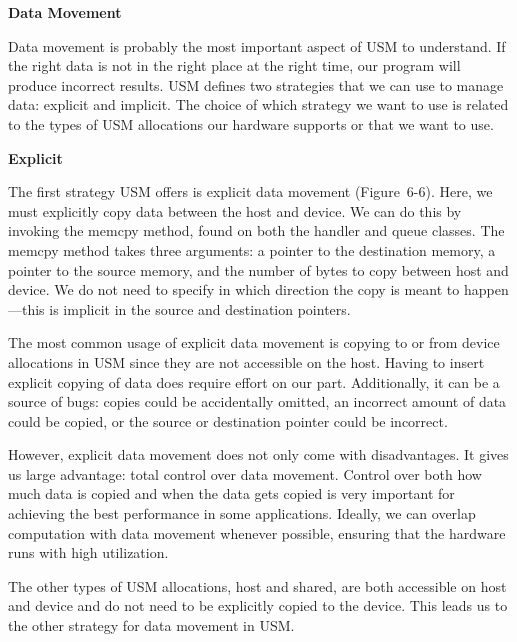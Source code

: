 \hspace*{\fill} \par %
\textbf{Data Movement}

Data movement is probably the most important aspect of USM to understand. If the right data is not in the right place at the right time, our program will produce incorrect results. USM defines two strategies that we can use to manage data: explicit and implicit. The choice of which strategy we want to use is related to the types of USM allocations our hardware supports or that we want to use.\par

\hspace*{\fill} \par %
\textbf{Explicit}

The first strategy USM offers is explicit data movement (Figure 6-6). Here, we must explicitly copy data between the host and device. We can do this by invoking the memcpy method, found on both the handler and queue classes. The memcpy method takes three arguments: a pointer to the destination memory, a pointer to the source memory, and the number of bytes to copy between host and device. We do not need to specify in which direction the copy is meant to happen—this is implicit in the source and destination pointers.\par

The most common usage of explicit data movement is copying to or from device allocations in USM since they are not accessible on the host. Having to insert explicit copying of data does require effort on our part. Additionally, it can be a source of bugs: copies could be accidentally omitted, an incorrect amount of data could be copied, or the source or destination pointer could be incorrect.\par

However, explicit data movement does not only come with disadvantages. It gives us large advantage: total control over data movement. Control over both how much data is copied and when the data gets copied is very important for achieving the best performance in some applications. Ideally, we can overlap computation with data movement whenever possible, ensuring that the hardware runs with high utilization.\par

The other types of USM allocations, host and shared, are both accessible on host and device and do not need to be explicitly copied to the device. This leads us to the other strategy for data movement in USM.\par

